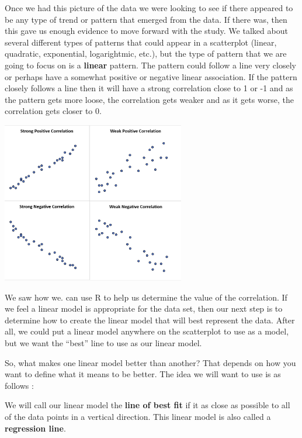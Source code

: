 \documentclass[
  letterpaper,
  DIV=11,
  numbers=noendperiod]{scrreprt}
\begin{document}
Once we had this picture of the data we were looking to see if there
appeared to be any type of trend or pattern that emerged from the data.
If there was, then this gave us enough evidence to move forward with the
study. We talked about several different types of patterns that could
appear in a scatterplot (linear, quadratic, exponential, logarightmic,
etc.), but the type of pattern that we are going to focus on is a
\textbf{linear} pattern. The pattern could follow a line very closely or
perhaps have a somewhat positive or negative linear association. If the
pattern closely follows a line then it will have a strong correlation
close to 1 or -1 and as the pattern gets more loose, the correlation
gets weaker and as it gets worse, the correlation gets closer to 0.

\includegraphics[width=0.6\textwidth,height=\textheight]{./images/LMR_1.jpg}

We saw how we. can use R to help us determine the value of the
correlation. If we feel a linear model is appropriate for the data set,
then our next step is to determine how to create the linear model that
will best represent the data. After all, we could put a linear model
anywhere on the scatterplot to use as a model, but we want the ``best''
line to use as our linear model.

So, what makes one linear model better than another? That depends on how
you want to define what it means to be better. The idea we will want to
use is as follows :

\begin{tcolorbox}[enhanced jigsaw, breakable, arc=.35mm, leftrule=.75mm, toprule=.15mm, titlerule=0mm, coltitle=black, colframe=quarto-callout-tip-color-frame, left=2mm, opacitybacktitle=0.6, rightrule=.15mm, bottomrule=.15mm, colback=white, toptitle=1mm, opacityback=0, title=\textcolor{quarto-callout-tip-color}{\faLightbulb}\hspace{0.5em}{Line Of Best Fit}, bottomtitle=1mm, colbacktitle=quarto-callout-tip-color!10!white]

We will call our linear model the \textbf{line of best fit} if it as
close as possible to all of the data points in a vertical direction.
This linear model is also called a \textbf{regression line}.

\end{tcolorbox}
\end{document}
